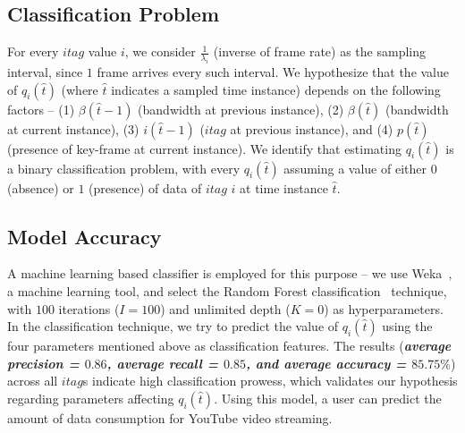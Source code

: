 \subsection{Classification Problem} For every $itag$ value $i$, we consider $\frac{1}{\lambda_i}$ (inverse of frame rate) as the sampling interval, since $1$ frame arrives every such interval.
We hypothesize that the value of $q_i(\hat{t})$ (where $\hat{t}$ indicates a sampled time instance) depends on the following factors -- (1) $\beta(\hat{t}-1)$ (bandwidth at previous instance), (2) $\beta(\hat{t})$ (bandwidth at current instance), (3) $i(\hat{t}-1)$ ($itag$ at previous instance), and (4) $p(\hat{t})$ (presence of key-frame at current instance).
We identify that estimating $q_i(\hat{t})$ is a binary classification problem, with every $q_i(\hat{t})$ assuming a value of either $0$ (absence) or $1$ (presence) of data of $itag$ $i$ at time instance $\hat{t}$.

\subsection{Model Accuracy} A machine learning based classifier is employed for this purpose -- we use Weka~\cite{witten2016data}, a machine learning tool, and select the Random Forest classification~\cite{breiman2001random} technique, with $100$ iterations ($I=100$) and unlimited depth ($K=0$) as hyperparameters.
In the classification technique, we try to predict the value of $q_i(\hat{t})$ using the four parameters mentioned above as classification features.
The results (\emph{\textbf{average precision = $0.86$, average recall = $0.85$, and average accuracy = $85.75\%$}}) across all $itag$s indicate high classification prowess, which validates our hypothesis regarding parameters affecting $q_i(\hat{t})$.
Using this model, a user can predict the amount of data consumption for YouTube video streaming.
